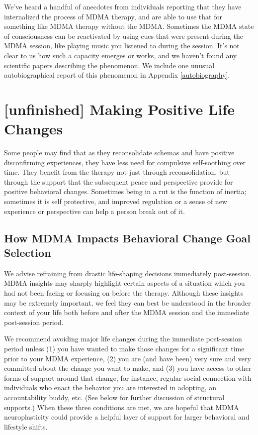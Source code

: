 \documentclass[12pt,letterpaper]{book}
\begin{document}
We've heard a handful of anecdotes from individuals reporting that they have internalized the process of MDMA therapy, and are able to use that for something like MDMA therapy without the MDMA. Sometimes the MDMA state of consciousness can be reactivated by using cues that were present during the MDMA session, like playing music you listened to during the session. It's not clear to us how such a capacity emerges or works, and we haven't found any scientific papers describing the phenomenon. We include one unusual autobiographical report of this phenomenon in Appendix \ref{autobiography}.
\section{[unfinished] Making Positive Life Changes}
\label{sec:behavioralchange}
Some people may find that as they reconsolidate schemas and have positive disconfirming experiences, they have less need for compulsive self-soothing over time. They benefit from the therapy not just through reconsolidation, but through the support that the subsequent peace and perspective provide for positive behavioral changes. Sometimes being in a rut is the function of inertia; sometimes it is self protective, and improved regulation or a sense of new experience or perspective can help a person break out of it.

\subsection*{How MDMA Impacts Behavioral Change Goal Selection}

We advise refraining from drastic life-shaping decisions immediately post-session. MDMA insights may sharply highlight certain aspects of a situation which you had not been facing or focusing on before the therapy. Although these insights may be extremely important, we feel they can best be understood in the broader context of your life both before and after the MDMA session and the immediate post-session period.

We recommend avoiding major life changes during the immediate post-session period unless (1) you have wanted to make those changes for a significant time prior to your MDMA experience, (2) you are (and have been) very sure and very committed about the change you want to make, and (3) you have access to other forms of support around that change, for instance, regular social connection with individuals who enact the behavior you are interested in adopting, an accountability buddy, etc. (See below for further discussion of structural supports.) When these three conditions are met, we are hopeful that MDMA neuroplasticity could provide a helpful layer of support for larger behavioral and lifestyle shifts.
\end{document}
